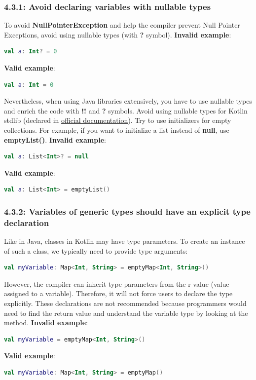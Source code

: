 \subsubsection*{\textbf{4.3.1: Avoid declaring variables with nullable types}}
\leavevmode\newline
\label{sec:4.3.1}
To avoid \textbf{NullPointerException} and help the compiler prevent Null Pointer Exceptions, avoid using nullable types (with \textbf{?} symbol).
\textbf{Invalid example}:
\begin{lstlisting}[language=Kotlin]
val a: Int? = 0
\end{lstlisting}
\textbf{Valid example}:
\begin{lstlisting}[language=Kotlin]
val a: Int = 0
\end{lstlisting}
Nevertheless, when using Java libraries extensively, you have to use nullable types and enrich the code with \textbf{!!} and \textbf{?} symbols.
Avoid using nullable types for Kotlin stdlib (declared in \href{https://kotlinlang.org/api/latest/jvm/stdlib/kotlin.collections/}{official documentation}). 
Try to use initializers for empty collections. For example, if you want to initialize a list instead of \textbf{null}, use \textbf{emptyList()}.
\textbf{Invalid example}:
\begin{lstlisting}[language=Kotlin]
val a: List<Int>? = null 
\end{lstlisting}
\textbf{Valid example}:
\begin{lstlisting}[language=Kotlin]
val a: List<Int> = emptyList()
\end{lstlisting}
\subsubsection*{\textbf{4.3.2: Variables of generic types should have an explicit type declaration}}
\leavevmode\newline
\label{sec:4.3.2}
Like in Java, classes in Kotlin may have type parameters. To create an instance of such a class, we typically need to provide type arguments:
\begin{lstlisting}[language=Kotlin]
val myVariable: Map<Int, String> = emptyMap<Int, String>() 
\end{lstlisting}
However, the compiler can inherit type parameters from the r-value (value assigned to a variable). Therefore, it will not force users to declare the type explicitly.
These declarations are not recommended because programmers would need to find the return value and understand the variable type by looking at the method.
\textbf{Invalid example}:
\begin{lstlisting}[language=Kotlin]
val myVariable = emptyMap<Int, String>() 
\end{lstlisting}
\textbf{Valid example}:
\begin{lstlisting}[language=Kotlin]
val myVariable: Map<Int, String> = emptyMap() 
\end{lstlisting}

